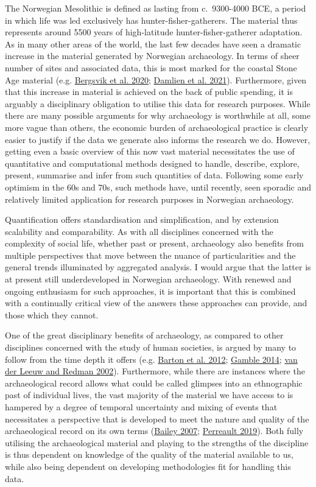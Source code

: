 \documentclass[
  12pt,
  a4paper,
  oneside]{book}
\begin{document}
The Norwegian Mesolithic is defined as lasting from c.~9300-4000 BCE, a period in which life was led exclusively has hunter-fisher-gatherers. The material thus represents around 5500 years of high-latitude hunter-fisher-gatherer adaptation. As in many other areas of the world, the last few decades have seen a dramatic increase in the material generated by Norwegian archaeology. In terms of sheer number of sites and associated data, this is most marked for the coastal Stone Age material (e.g. \protect\hyperlink{ref-bergsvik2020}{Bergsvik et al. 2020}; \protect\hyperlink{ref-damlien2021}{Damlien et al. 2021}). Furthermore, given that this increase in material is achieved on the back of public spending, it is arguably a disciplinary obligation to utilise this data for research purposes. While there are many possible arguments for why archaeology is worthwhile at all, some more vague than others, the economic burden of archaeological practice is clearly easier to justify if the data we generate also informs the research we do. However, getting even a basic overview of this now vast material necessitates the use of quantitative and computational methods designed to handle, describe, explore, present, summarise and infer from such quantities of data. Following some early optimism in the 60s and 70s, such methods have, until recently, seen sporadic and relatively limited application for research purposes in Norwegian archaeology.

Quantification offers standardisation and simplification, and by extension scalability and comparability. As with all disciplines concerned with the complexity of social life, whether past or present, archaeology also benefits from multiple perspectives that move between the nuance of particularities and the general trends illuminated by aggregated analysis. I would argue that the latter is at present still underdeveloped in Norwegian archaeology. With renewed and ongoing enthusiasm for such approaches, it is important that this is combined with a continually critical view of the answers these approaches can provide, and those which they cannot.

One of the great disciplinary benefits of archaeology, as compared to other disciplines concerned with the study of human societies, is argued by many to follow from the time depth it offers (e.g. \protect\hyperlink{ref-barton2012}{Barton et al. 2012}; \protect\hyperlink{ref-gamble2014}{Gamble 2014}; \protect\hyperlink{ref-vanderleeuw2002}{van der Leeuw and Redman 2002}). Furthermore, while there are instances where the archaeological record allows what could be called glimpses into an ethnographic past of individual lives, the vast majority of the material we have access to is hampered by a degree of temporal uncertainty and mixing of events that necessitates a perspective that is developed to meet the nature and quality of the archaeological record on its own terms (\protect\hyperlink{ref-bailey2007}{Bailey 2007}; \protect\hyperlink{ref-perreault2019}{Perreault 2019}). Both fully utilising the archaeological material and playing to the strengths of the discipline is thus dependent on knowledge of the quality of the material available to us, while also being dependent on developing methodologies fit for handling this data.
\end{document}

